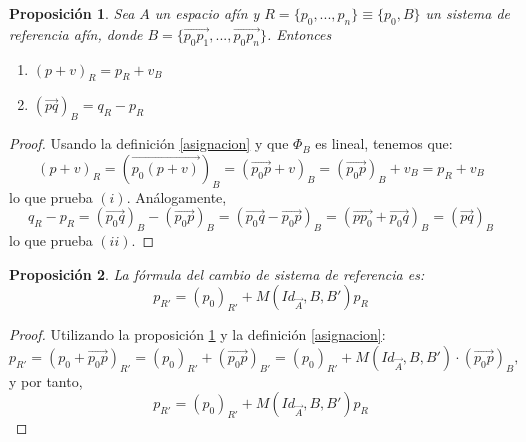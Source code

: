 \documentclass[a4paper,11pt, oneside]{book}
\newtheorem{prop}{Proposición}
\begin{document}
\begin{prop}
	\label{aux}
	Sea $A$ un espacio afín y $R = \{p_0,...,p_n\} \equiv \{p_0,B\}$ un sistema de referencia afín, donde $B = \{\overrightarrow{p_0p_1},...,\overrightarrow{p_0p_n}\}$. Entonces
	\begin{enumerate}
		\item $(p+v)_R = p_R + v_B$
		\item $(\overrightarrow{pq})_B = q_R - p_R$
	\end{enumerate}
\end{prop}
\begin{proof}
	Usando la definición \ref{asignacion} y que $\Phi_B$ es lineal, tenemos que:
	\begin{equation}
	(p+v)_R = (\overrightarrow{p_0(p+v)})_B = (\overrightarrow{p_0p}+v)_B = (\overrightarrow{p_0p})_B +v_B = p_R +v_B
	\end{equation}
	lo que prueba $(i)$. Análogamente,
	\begin{equation}
	q_R - p_R = (\overrightarrow{p_0q})_B - (\overrightarrow{p_0p})_B = (\overrightarrow{p_0q} - \overrightarrow{p_0p})_B = (\overrightarrow{pp_0}+\overrightarrow{p_0q})_B = (\overrightarrow{pq})_B
	\end{equation}
	lo que prueba $(ii)$.
\end{proof}
\begin{prop}
		La fórmula del cambio de sistema de referencia es:
	\begin{equation}
		p_{R'} = (p_0)_{R'} + M(Id_{\overrightarrow{A}}, B, B')p_R
	\end{equation}
\end{prop}
\begin{proof}
	Utilizando la proposición \ref{aux} y la definición \ref{asignacion}:
	\begin{equation}
	p_{R'} = (p_0 + \overrightarrow{p_0p})_{R'} = (p_0)_{R'} + (\overrightarrow{p_{0}p})_{B'} = (p_0)_{R'} + M(Id_{\overrightarrow{A}}, B, B') \cdot  (\overrightarrow{p_0p})_B,
	\end{equation}
	y por tanto,
	\begin{equation}
	p_{R'} = (p_0)_{R'} + M(Id_{\overrightarrow{A}}, B, B')p_R
	\end{equation}
\end{proof}
\end{document}
